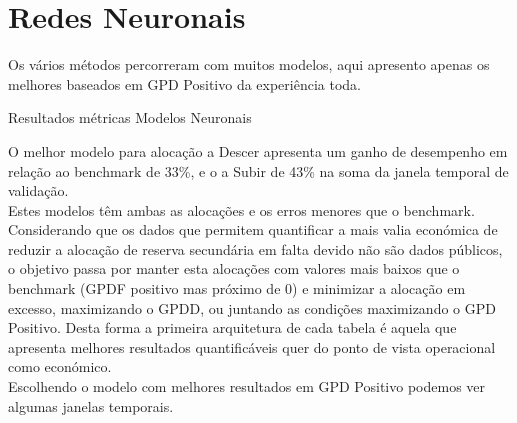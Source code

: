 \section{Redes Neuronais \label{se:resml}}

Os vários métodos percorreram com muitos modelos, aqui apresento apenas os melhores baseados em GPD Positivo da experiência toda.\\


\begin{table}[H]
    \caption{Resultados métricas Modelos Neuronais}    
    \resizebox{\linewidth}{!}{}
    \label{tab:mlresmetrics}
    \end{table}

O melhor modelo para alocação a Descer apresenta um ganho de desempenho em relação ao benchmark de 33\%, e o a Subir de 43\% na soma da janela temporal de validação.\\
Estes modelos têm ambas as alocações e os erros menores que o benchmark. Considerando que os dados que permitem quantificar a mais valia económica de reduzir a alocação de reserva secundária em falta devido não são dados públicos, o objetivo passa por manter esta alocações com valores mais baixos que o benchmark (GPDF positivo mas próximo de 0) e minimizar a alocação em excesso, maximizando o GPDD, ou juntando as condições maximizando o GPD Positivo. Desta forma a primeira arquitetura de cada tabela é aquela que apresenta melhores resultados quantificáveis quer do ponto de vista operacional como económico.\\
Escolhendo o modelo com melhores resultados em GPD Positivo podemos ver algumas janelas temporais.\\



